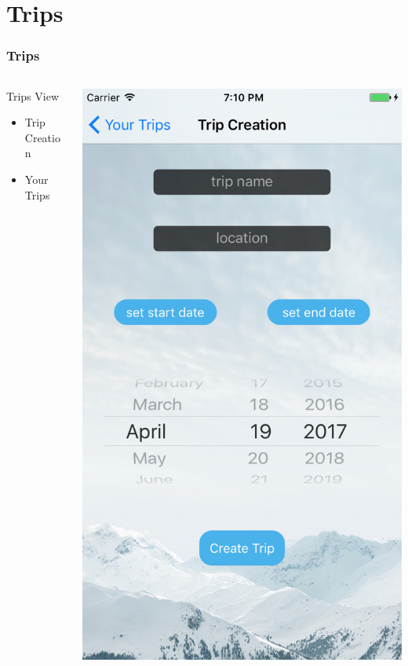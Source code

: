 \documentclass{beamer}
\begin{document}
\section{Trips}
\begin{frame}
\frametitle{Trips}
\begin{columns}
    \begin{column}{0.3\textwidth}
        Trips View
        \begin{itemize}
            \item Trip Creation
            \item Your Trips
        \end{itemize}
    \end{column}
    \begin{column}{0.3\textwidth}  %
        \begin{center}
            \includegraphics[scale=0.3]{newTrip}

\end{center}
\end{column}
\end{columns}
\end{frame}
\end{document}
